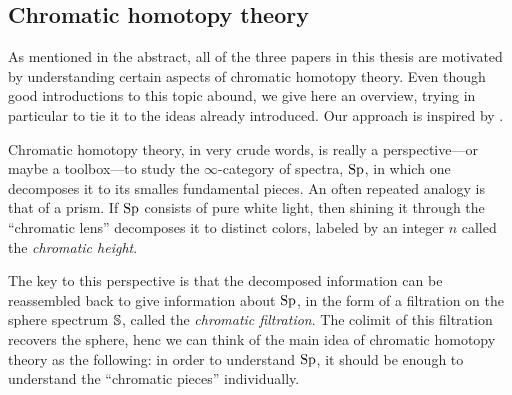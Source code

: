 

\subsection{Chromatic homotopy theory}
\label{ch0:ssec:chromatic-homotopy-theory}

As mentioned in the abstract, all of the three papers in this thesis are motivated by understanding certain aspects of chromatic homotopy theory. Even though good introductions to this topic abound, we give here an overview, trying in particular to tie it to the ideas already introduced. Our approach is inspired by \cite{barthel-beaudry_19}. 

Chromatic homotopy theory, in very crude words, is really a perspective---or maybe a toolbox---to study the $\infty$-category of spectra, $\Sp$, in which one decomposes it to its smalles fundamental pieces. An often repeated analogy is that of a prism. If $\Sp$ consists of pure white light, then shining it through the ``chromatic lens'' decomposes it to distinct colors, labeled by an integer $n$ called the \emph{chromatic height}. 

\begin{center}
\end{center}

The key to this perspective is that the decomposed information can be reassembled back to give information about $\Sp$, in the form of a filtration on the sphere spectrum $\S$, called the \emph{chromatic filtration}. The colimit of this filtration recovers the sphere, henc we can think of the main idea of chromatic homotopy theory as the following: in order to understand $\Sp$, it should be enough to understand the ``chromatic pieces'' individually. 


